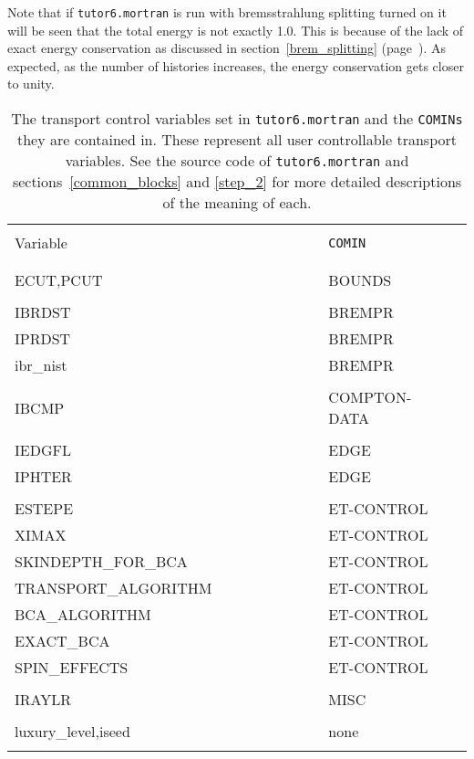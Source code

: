 Note that if {\tt tutor6.mortran} is run with bremsstrahlung splitting
turned on it will be seen that the total energy is not exactly 1.0. This
is because of the lack of exact energy conservation as discussed in
section~\ref{brem_splitting} (page~\pageref{brem_splitting}). As expected,
as the number of histories increases, the energy conservation gets closer
to unity.

\begin{table}
\begin{center}
\caption{The transport control variables set in {\tt tutor6.mortran} and
the {\tt COMINs} they are contained in. These represent all user controllable
transport variables. See the source code of
{\tt tutor6.mortran} and 
sections~\ref{common_blocks} and \ref{step_2}
for more detailed descriptions of the meaning of each.\vspace{3mm} }
\label{tab_tutor6}
\begin{tabular}{ll}
\hline
&\\
Variable & {\tt COMIN} \\
&\\
\hline
&\\
ECUT,PCUT   &  BOUNDS\\
&\\
IBRDST      & BREMPR\\
IPRDST       & BREMPR\\
ibr\_nist     & BREMPR \\
&\\
IBCMP        & COMPTON-DATA~~~~~~~~~\\
&\\
IEDGFL      & EDGE\\
IPHTER      & EDGE\\
&\\
ESTEPE      & ET-CONTROL \\
XIMAX			&ET-CONTROL \\
SKINDEPTH\_FOR\_BCA	&ET-CONTROL \\
TRANSPORT\_ALGORITHM~~~~~~~~~~~~~~	&ET-CONTROL \\
BCA\_ALGORITHM		&ET-CONTROL \\
EXACT\_BCA		&ET-CONTROL \\
SPIN\_EFFECTS		&ET-CONTROL \\
&\\
IRAYLR   		&MISC\\
&\\
luxury\_level,iseed      & none \\
&\\
\hline
\end{tabular}
\end{center}
\end{table}


